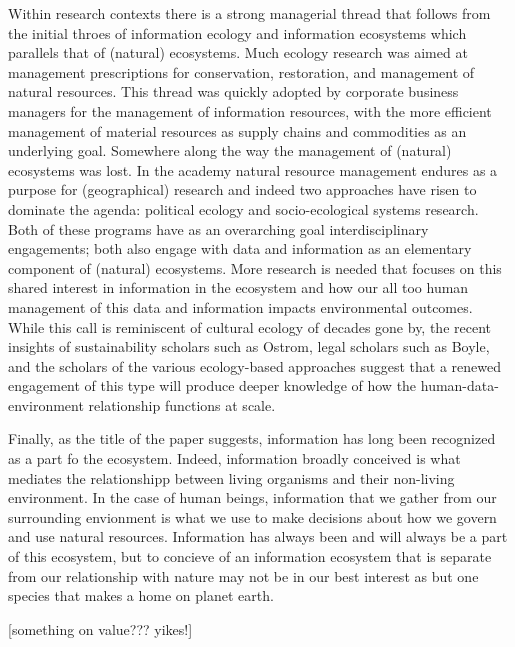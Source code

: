 Within research contexts there is a strong managerial thread that follows from the initial throes of information ecology and information ecosystems which parallels that of (natural) ecosystems. Much ecology research was aimed at management prescriptions for conservation, restoration, and management of natural resources. This thread was quickly adopted by corporate business managers for the management of information resources, with the more efficient management of material resources as supply chains and commodities as an underlying goal. Somewhere along the way the management of (natural) ecosystems was lost. In the academy natural resource management endures as a purpose for (geographical) research and indeed two approaches have risen to dominate the agenda: political ecology and socio-ecological systems research. Both of these programs have as an overarching goal interdisciplinary engagements; both also engage with data and information as an elementary component of (natural) ecosystems. More research is needed that focuses on this shared interest in information in the ecosystem and how our all too human management of this data and information impacts environmental outcomes. While this call is reminiscent of cultural ecology of decades gone by, the recent insights of sustainability scholars such as Ostrom, legal scholars such as Boyle, and the scholars of the various ecology-based approaches suggest that a renewed engagement of this type will produce deeper knowledge of how the human-data-environment relationship functions at scale.

Finally, as the title of the paper suggests, information has long been recognized as a part fo the ecosystem. Indeed, information broadly conceived is what mediates the relationshipp between living organisms and their non-living environment. In the case of human beings, information that we gather from our surrounding envionment is what we use to make decisions about how we govern and use natural resources. Information has always been and will always be a part of this ecosystem, but to concieve of an information ecosystem that is separate from our relationship with nature may not be in our best interest as but one species that makes a home on planet earth.

[something on value??? yikes!]